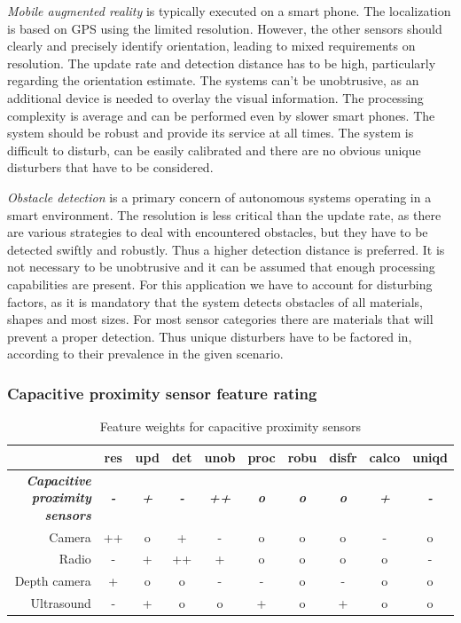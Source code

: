 \emph{Mobile augmented reality} is typically executed on a smart phone. The localization is based on GPS using the limited resolution. However, the other sensors should clearly and precisely identify orientation, leading to mixed requirements on resolution. The update rate and detection distance has to be high, particularly regarding the orientation estimate. The systems can't be unobtrusive, as an additional device is needed to overlay the visual information. The processing complexity is average and can be performed even by slower smart phones. The system should be robust and provide its service at all times. The system is difficult to disturb, can be easily calibrated and there are no obvious unique disturbers that have to be considered.

\emph{Obstacle detection} is a primary concern of autonomous systems operating in a smart environment. The resolution is less critical than the update rate, as there are various strategies to deal with encountered obstacles, but they have to be detected swiftly and robustly. Thus a higher detection distance is preferred. It is not necessary to be unobtrusive and it can be assumed that enough processing capabilities are present. For this application we have to account for disturbing factors, as it is mandatory that the system detects obstacles of all materials, shapes and most sizes. For most sensor categories there are materials that will prevent a proper detection. Thus unique disturbers have to be factored in, according to their prevalence in the given scenario.

\subsubsection*{Capacitive proximity sensor feature rating}
\begin{table}[htbp]
  \centering
  \caption{Feature weights for capacitive proximity sensors}
    \begin{tabular}{rccccccccc}
    \toprule
          & res   & upd   & det   & unob  & proc  & robu  & disfr & calco & uniqd \\
    \midrule
    \textit{\textbf{Capacitive proximity sensors}} & \textit{\textbf{-}} & \textit{\textbf{+}} & \textit{\textbf{-}} & \textit{\textbf{++}} & \textit{\textbf{o}} & \textit{\textbf{o}} & \textit{\textbf{o}} & \textit{\textbf{+}} & \textit{\textbf{-}} \\
    \midrule
    Camera & ++    & o     & +     & -     & o     & o     & o     & -     & o \\
    Radio & -     & +     & ++    & +     & o     & o     & o     & o     & - \\
    Depth camera & +     & o     & o     & -     & -     & o     & -     & o     & o \\
    Ultrasound & -     & +     & o     & o     & +     & o     & +     & o     & o \\
    \bottomrule
    \end{tabular}%

  \label{tab:bench_cap_feat_weights}
\end{table}

